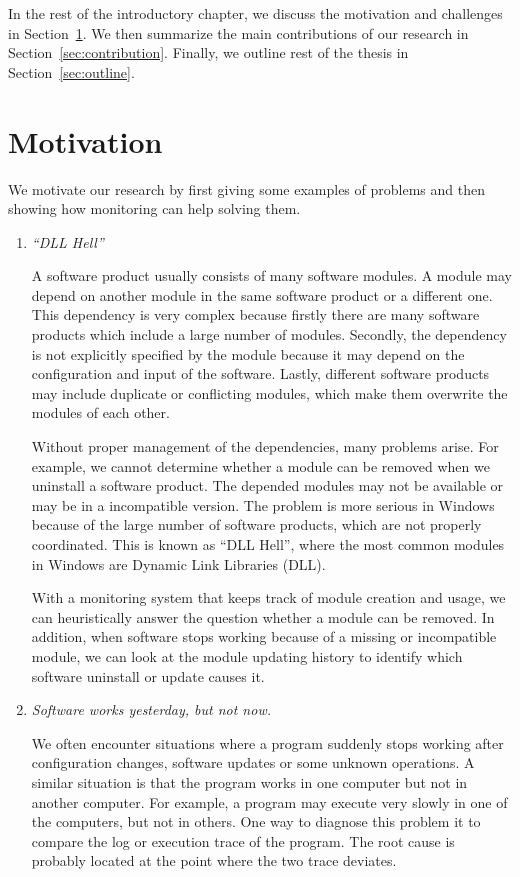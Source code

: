 In the rest of the introductory chapter,
we discuss the motivation and challenges in Section~\ref{sec:motivation}.
We then summarize the main contributions of our research in
Section~\ref{sec:contribution}.
Finally, we outline rest of the thesis in Section~\ref{sec:outline}.

\section{Motivation}
\label{sec:motivation}

We motivate our research by first giving some examples of problems and
then showing how monitoring can help solving them.

\begin{enumerate}
\item {\em ``DLL Hell''}

A software product usually consists of many software modules.
A module may depend on another module in the same software product or
a different one.
This dependency is very complex because firstly there are many
software products which include a large number of modules.
Secondly, the dependency is not explicitly specified by the module
because it may depend on the configuration and input of the software.
Lastly, different software products may include duplicate or conflicting
modules, which make them overwrite the modules of each other.

Without proper management of the dependencies, many problems arise.
For example, we cannot determine whether a module can be removed
when we uninstall a software product.
The depended modules may not be available or may be in
a incompatible version.
The problem is more serious in Windows because of the large
number of software products, which are not properly coordinated.
This is known as ``DLL Hell'', where the most common modules
in Windows are Dynamic Link Libraries (DLL).

With a monitoring system that keeps track of module creation and usage,
we can heuristically answer the question whether a module can be removed.
In addition,
when software stops working because of a missing or incompatible module,
we can look at the module updating history to identify which software
uninstall or update causes it.

\item {\em Software works yesterday, but not now.}

We often encounter situations where a program suddenly stops working after
configuration changes, software updates or some unknown operations.
A similar situation is that the program works in one computer but not in
another computer.
For example, a program may execute very slowly in one of the computers,
but not in others.
One way to diagnose this problem it to compare the log or execution trace
of the program.
The root cause is probably located at the point where the two trace deviates.


\end{enumerate}
